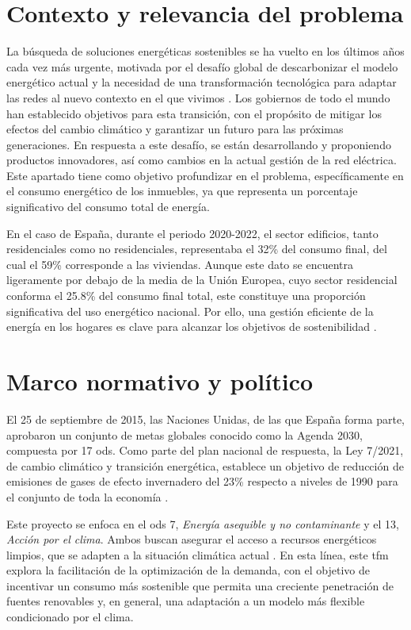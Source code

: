 \documentclass[11pt,a4paper]{book}
\begin{document}
\section{Contexto y relevancia del problema}

La búsqueda de soluciones energéticas sostenibles se ha vuelto en los últimos años cada vez más urgente, motivada por el desafío global de descarbonizar el modelo energético actual y la necesidad de una transformación tecnológica para adaptar las redes al nuevo contexto en el que vivimos \cite{futured2024}. Los gobiernos de todo el mundo han establecido objetivos para esta transición, con el propósito de mitigar los efectos del cambio climático y garantizar un futuro para las próximas generaciones. En respuesta a este desafío, se están desarrollando y proponiendo productos innovadores, así como cambios en la actual gestión de la red eléctrica. Este apartado tiene como objetivo profundizar en el problema, específicamente en el consumo energético de los inmuebles, ya que representa un porcentaje significativo del consumo total de energía. 

En el caso de España, durante el periodo 2020-2022, el sector edificios, tanto residenciales como no residenciales, representaba el 32\% del consumo final, del cual el 59\% corresponde a las viviendas. Aunque este dato se encuentra \mbox{ligeramente} por debajo de la media de la Unión Europea, cuyo sector residencial conforma el 25.8\% del consumo final total, este constituye una proporción significativa del uso energético nacional. Por ello, una gestión eficiente de la energía en los hogares es clave para alcanzar los objetivos de sostenibilidad \cite{estrategiaDesarrolloSostenible2022, eurostat2023buildings, odysseeSpain2024}.

\section{Marco normativo y político}

El 25 de septiembre de 2015, las Naciones Unidas, de las que España forma parte, aprobaron un conjunto de metas globales conocido como la Agenda 2030, compuesta por 17 \gls{ods}. Como parte del plan nacional de respuesta, la Ley 7/2021, de cambio climático y transición energética, establece un objetivo de reducción de emisiones de gases de efecto invernadero del 23\% respecto a niveles de 1990 para el conjunto de toda la economía \cite{objetivosReduccion2025}. 

Este proyecto se enfoca en el \gls{ods} 7, \textit{Energía asequible y no contaminante} y el 13, \textit{Acción por el clima}. Ambos buscan asegurar el acceso a recursos energéticos limpios, que se adapten a la situación climática actual \cite{agenda2030espana}. En esta línea, este \gls{tfm} explora la facilitación de la optimización de la demanda, con el objetivo de incentivar un consumo más sostenible que permita una creciente penetración de fuentes renovables y, en general, una adaptación a un modelo más flexible condicionado por el clima.
\end{document}
